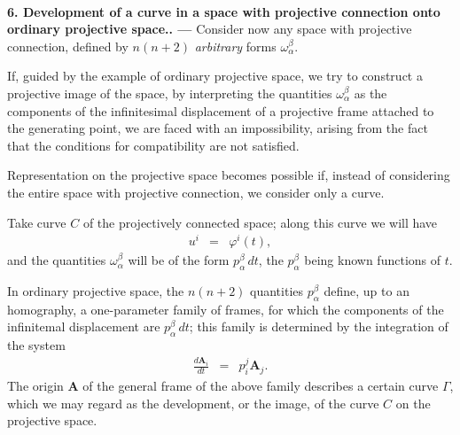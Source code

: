 
\ \\

{\bf 6. Development of a curve in a space with projective connection  onto ordinary projective space.. --- }
% 
Consider now any space with projective connection, defined by $n(n+2)$ {\em arbitrary} forms $\omega^\beta_\alpha$.

If, guided by the example of ordinary projective space, we try to construct a projective image of the space, by interpreting the quantities $\omega^\beta_\alpha$ as the components of the infinitesimal displacement of a projective frame attached to the generating point, we are faced with an impossibility, arising from the fact that the conditions for compatibility are not satisfied.

Representation on the projective space becomes possible if, instead of considering the entire space with projective connection, we consider only a curve.

Take curve $C$ of the projectively connected space; along this curve we will have 
\begin{eqnarray*}
u^i &=& \varphi^i(t) ,
\end{eqnarray*}
and the quantities $\omega^\beta_\alpha$ will be of the form $p^\beta_\alpha\, dt$, the $p^\beta_\alpha$ being known functions of $t$.

In ordinary projective space, the $n (n + 2)$ quantities $p^\beta_\alpha$ define, up to an homography, a one-parameter family of frames, for which the components of the infinitemal displacement are $p^\beta_\alpha\, dt$; this family is determined by the integration of the system
\begin{eqnarray*}
\frac{d\bm A_i}{dt} &=& p^j_i \bm A_j.
\end{eqnarray*}
The origin $\bm A$ of the general frame of the above family describes a certain curve $\Gamma$, which we may regard as the development, or the image, of the curve $C$ on the projective space. 

